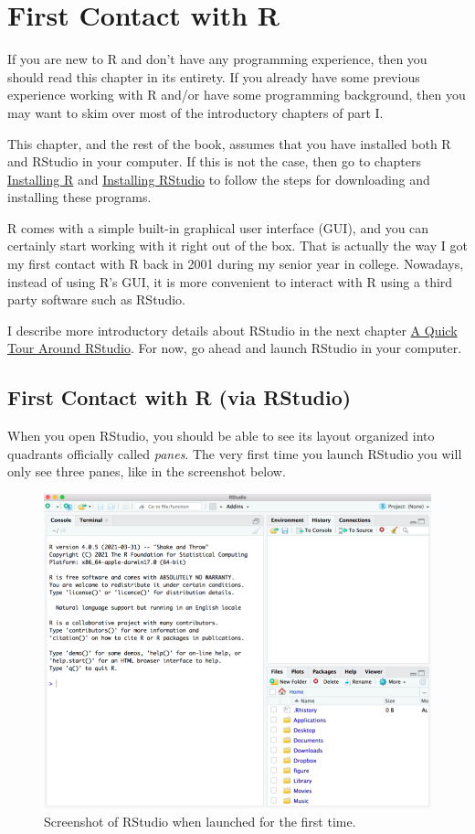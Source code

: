 \documentclass[
]{book}
\begin{document}
\hypertarget{rintro}{%
\chapter{First Contact with R}\label{rintro}}

If you are new to R and don't have any programming experience, then you
should read this chapter in its entirety. If you already have some previous
experience working with R and/or have some programming background, then you may
want to skim over most of the introductory chapters of part I.

This chapter, and the rest of the book, assumes that you have installed both R
and RStudio in your computer. If this is not the case, then go to chapters
\protect\hyperlink{installing-r}{Installing R} and \protect\hyperlink{installing-rstudio}{Installing RStudio} to
follow the steps for downloading and installing these programs.

R comes with a simple built-in graphical user interface (GUI), and you can
certainly start working with it right out of the box. That is actually the way
I got my first contact with R back in 2001 during my senior year in college.
Nowadays, instead of using R's GUI, it is more convenient to interact with R
using a third party software such as RStudio.

I describe more introductory details about RStudio in the next chapter
\protect\hyperlink{rstudio}{A Quick Tour Around RStudio}. For now, go ahead and launch RStudio
in your computer.

\hypertarget{first-contact-with-r-via-rstudio}{%
\section{First Contact with R (via RStudio)}\label{first-contact-with-r-via-rstudio}}

When you open RStudio, you should be able to see its layout organized into
quadrants officially called \emph{panes}. The very first time you launch RStudio you
will only see three panes, like in the screenshot below.

\begin{figure}

{\centering \includegraphics[width=0.7\linewidth]{images/rstudio/rstudio-launch-first-time} 

}

\caption{Screenshot of RStudio when launched for the first time.}\label{fig:unnamed-chunk-16}
\end{figure}
\end{document}
